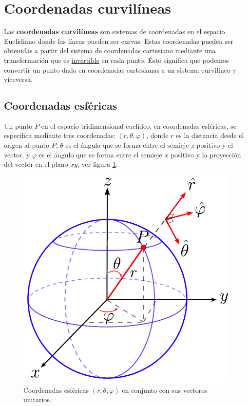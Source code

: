 \section{Coordenadas curvilíneas}

Las \textbf{coordenadas curvilíneas} son sistemas de coordenadas en el espacio Euclidiano donde las líneas pueden ser curvas. Estas coordenadas pueden ser obtenidas a partir del sistema de coordenadas cartesiano mediante una transformación que es \underline{invertible} en cada punto. Ésto significa que podemos convertir un punto dado en coordenadas cartesianas a un sistema curvilíneo y viceversa.

\subsection{Coordenadas esféricas}

Un punto $P$ en el espacio tridimensional euclídeo, en coordenadas esféricas, se especifica mediante tres coordenadas: $(r, \theta, \varphi)$, donde $r$ es la distancia desde el origen al punto $P$, $\theta$ es el ángulo que se forma entre el semieje $z$ positivo y el vector, y $\varphi$ es el ángulo que se forma entre el semieje $x$ positivo y la proyección del vector en el plano $xy$, ver figura \ref{fig:Coordenadas-Esfericas}.

\begin{figure}[H]
    \centering
    \includegraphics[scale = 0.65]{Figuras/Coordenadas-Esfericas.pdf}
    \caption{Coordenadas esféricas $(r,\theta,\varphi)$ en conjunto con sus vectores unitarios.}
    \label{fig:Coordenadas-Esfericas}
\end{figure}

